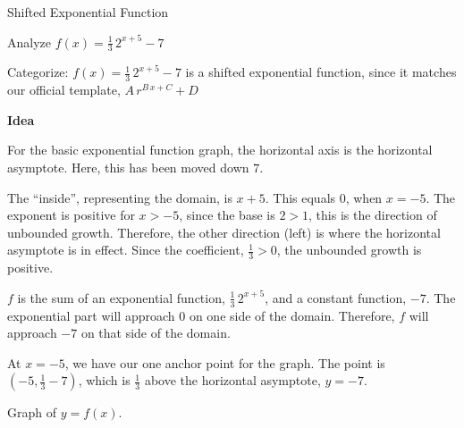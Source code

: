 \documentclass{ximera}
\begin{document}
\begin{example}  Shifted Exponential Function



Analyze   $f(x) = \frac{1}{3} \, 2^{x+5} - 7$ 

Categorize:  $f(x) = \frac{1}{3} \, 2^{x+5} - 7$ is a shifted exponential function, since it matches our official template,  $A \, r^{B \, x + C} + D$







\textbf{\textcolor{blue!55!black}{Idea}} 


For the basic exponential function graph, the horizontal axis is the horizontal asymptote.  Here, this has been moved down $7$.



The ``inside'', representing the domain, is $x+5$.  This equals $0$, when $x=-5$.  The exponent is positive for $x>-5$, since the base is $2 > 1$, this is the direction of unbounded growth.  Therefore, the other direction (left) is where the horizontal asymptote is in effect.  Since the coefficient, $\frac{1}{3} > 0$, the unbounded growth is positive. 


$f$ is the sum of an exponential function, $\frac{1}{3} \, 2^{x+5}$, and a constant function, $-7$.  The exponential part will approach $0$ on one side of the domain.  Therefore, $f$ will approach $-7$ on that side of the domain. 





At $x=-5$, we have our one anchor point for the graph.  The point is $\left(-5, \frac{1}{3} - 7 \right)$, which is $\frac{1}{3}$ above the horizontal asymptote, $y = -7$.


Graph of $y = f(x)$.

\begin{image}
\end{image}
\end{example}
\end{document}
